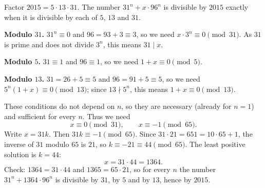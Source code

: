 Factor $2015=5\cdot13\cdot31$. The number $31^n+x\cdot96^n$ is divisible by $2015$ exactly when it is divisible by each of $5$, $13$ and $31$.

\textbf{Modulo $31$.} $31^n\equiv0$ and $96=93+3\equiv3$, so we need $x\cdot3^n\equiv0\pmod{31}$. As $31$ is prime and does not divide $3^n$, this means $31\mid x$.

\textbf{Modulo $5$.} $31\equiv1$ and $96\equiv1$, so we need $1+x\equiv0\pmod5$.

\textbf{Modulo $13$.} $31=26+5\equiv5$ and $96=91+5\equiv5$, so we need $5^n(1+x)\equiv0\pmod{13}$; since $13\nmid5^n$, this means $1+x\equiv0\pmod{13}$.

These conditions do not depend on $n$, so they are necessary (already for $n=1$) and sufficient for every $n$. Thus we need
\[
x\equiv0\pmod{31},\qquad x\equiv-1\pmod{65}.
\]
Write $x=31k$. Then $31k\equiv-1\pmod{65}$. Since $31\cdot21=651=10\cdot65+1$, the inverse of $31$ modulo $65$ is $21$, so $k\equiv-21\equiv44\pmod{65}$. The least positive solution is $k=44$:
\[
x=31\cdot44=\boxed{1364}.
\]
Check: $1364=31\cdot44$ and $1365=65\cdot21$, so for every $n$ the number $31^n+1364\cdot96^n$ is divisible by $31$, by $5$ and by $13$, hence by $2015$.
